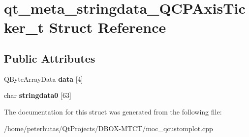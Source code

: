 \hypertarget{structqt__meta__stringdata___q_c_p_axis_ticker__t}{}\section{qt\+\_\+meta\+\_\+stringdata\+\_\+\+Q\+C\+P\+Axis\+Ticker\+\_\+t Struct Reference}
\label{structqt__meta__stringdata___q_c_p_axis_ticker__t}
\subsection*{Public Attributes}
\begin{DoxyCompactItemize}
\item 
\mbox{\label{structqt__meta__stringdata___q_c_p_axis_ticker__t_a0e5e6cc358157945592776d87e7d14b4}} 
Q\+Byte\+Array\+Data {\bfseries data} \mbox{[}4\mbox{]}
\item 
\mbox{\label{structqt__meta__stringdata___q_c_p_axis_ticker__t_a8600a85cebf0ead1c96536e854070e8b}} 
char {\bfseries stringdata0} \mbox{[}63\mbox{]}
\end{DoxyCompactItemize}


The documentation for this struct was generated from the following file\+:\begin{DoxyCompactItemize}
\item 
/home/peterhutas/\+Qt\+Projects/\+D\+B\+O\+X-\/\+M\+T\+C\+T/moc\+\_\+qcustomplot.\+cpp\end{DoxyCompactItemize}
